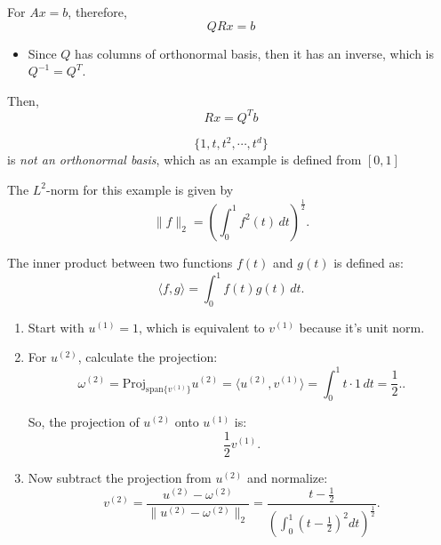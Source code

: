     \begin{intuition}
        For $Ax=b$, therefore, 
        \begin{equation*}
            QRx=b
        \end{equation*}
        \begin{itemize}
            \item Since $Q$ has columns of orthonormal basis, then it has an inverse, which is $Q^{-1} = Q^T$. 
        \end{itemize}
        \vspace{1em}

        Then, 
        \begin{equation*}
            Rx=Q^T b
        \end{equation*}
    \end{intuition}

    \begin{example}
        \[
        \{1, t, t^2, \cdots, t^d\}
        \]
        is \textit{not an orthonormal basis}, which as an example is defined from $[0,1]$
        \vspace{1em}

        The \( L^2 \)-norm for this example is given by
        \[
        \|f\|_{2} = \left( \int_0^1 f^2(t) \, dt \right)^{\frac{1}{2}}.
        \]
        \vspace{1em}

        The inner product between two functions \( f(t) \) and \( g(t) \) is defined as:
        \[
        \langle f, g \rangle = \int_0^1 f(t) g(t) \, dt.
        \]

        \begin{enumerate}                
            \item Start with \( u^{(1)} = 1 \), which is equivalent to \( v^{(1)} \) because it's unit norm.
        
            \item For \( u^{(2)} \), calculate the projection:
            \[
            \omega^{(2)} = \text{Proj}_{\text{span}\{v^{(1)}\}} u^{(2)} = \langle u^{(2)}, v^{(1)} \rangle = \int_0^1 t \cdot 1 \, dt = \frac{1}{2}..
            \]
            
        
            So, the projection of \( u^{(2)} \) onto \( u^{(1)} \) is:
            \[
            \frac{1}{2} v^{(1)}.
            \]
            
            \item Now subtract the projection from \( u^{(2)} \) and normalize:
            \[
            v^{(2)} = \frac{u^{(2)} - \omega^{(2)}}{\|u^{(2)} - \omega^{(2)}\|_{2}} = \frac{t - \frac{1}{2}}{\left( \int_0^1 \left(t - \frac{1}{2}\right)^2 dt \right)^{\frac{1}{2}}}.
            \]
            
        \end{enumerate}
    \end{example}

